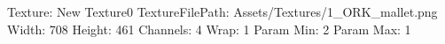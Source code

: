 Texture: New Texture0
TextureFilePath: Assets/Textures/1_ORK_mallet.png
Width: 708
Height: 461
Channels: 4
Wrap: 1
Param Min: 2
Param Max: 1